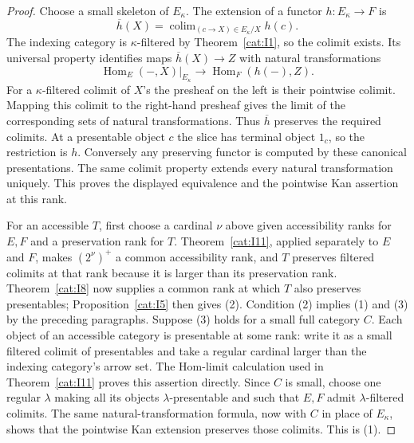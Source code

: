 \begin{proof}
Choose a small skeleton of $E_\kappa$.  The extension of a functor
$h:E_\kappa\to F$ is
\[
 \overline h(X)=\operatorname{colim}_{(c\to X)\in E_\kappa/X}h(c).
\]
The indexing category is $\kappa$-filtered by
Theorem~\ref{cat:I1}, so the colimit exists.  Its universal property
identifies maps $\overline h(X)\to Z$ with natural transformations
\[
 \operatorname{Hom}_E(-,X)|_{E_\kappa}
       \longrightarrow \operatorname{Hom}_F(h(-),Z).
\]
For a $\kappa$-filtered colimit of $X$'s the presheaf on the left is
their pointwise colimit.  Mapping this colimit to the right-hand
presheaf gives the limit of the corresponding sets of natural
transformations.  Thus $\overline h$ preserves the required colimits.
At a presentable object $c$ the slice has terminal object $1_c$, so
the restriction is $h$.  Conversely any preserving functor is
computed by these canonical presentations.  The same colimit
property extends every natural transformation uniquely.  This proves
the displayed equivalence and the pointwise Kan assertion at this rank.

For an accessible $T$, first choose a cardinal $\nu$ above given
accessibility ranks for $E,F$ and a preservation rank for $T$.
Theorem~\ref{cat:I11}, applied separately to $E$ and $F$, makes
$(2^\nu)^+$ a common accessibility rank, and $T$ preserves filtered
colimits at that rank because it is larger than its preservation rank.
Theorem~\ref{cat:I8} now supplies a common rank
at which $T$ also preserves presentables; Proposition~\ref{cat:I5}
then gives (2).  Condition (2) implies (1) and (3) by the preceding
paragraphs.
Suppose (3) holds for a small full category $C$.  Each object of an
accessible category is presentable at some rank: write it as a small
filtered colimit of presentables and take a regular cardinal larger
than the indexing category's arrow set.  The Hom-limit calculation
used in Theorem~\ref{cat:I11} proves this assertion directly.
Since $C$ is small, choose one regular $\lambda$ making all its
objects $\lambda$-presentable and such that $E,F$ admit
$\lambda$-filtered colimits.  The same natural-transformation formula,
now with $C$ in place of $E_\kappa$, shows that the pointwise Kan
extension preserves those colimits.  This is (1).
\end{proof}


